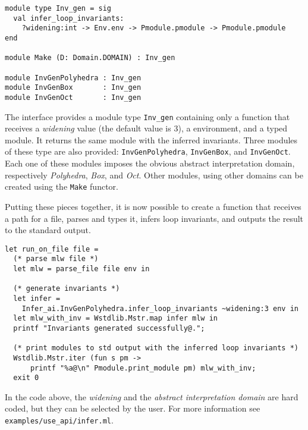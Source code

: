 \begin{verbatim}
module type Inv_gen = sig
  val infer_loop_invariants:
    ?widening:int -> Env.env -> Pmodule.pmodule -> Pmodule.pmodule
end

module Make (D: Domain.DOMAIN) : Inv_gen

module InvGenPolyhedra : Inv_gen
module InvGenBox       : Inv_gen
module InvGenOct       : Inv_gen
\end{verbatim}

The interface provides a module type \verb|Inv_gen| containing only a
function that receives a \emph{widening} value (the default value is
3), a \why environment, and a typed \why module. It returns the same
module with the inferred invariants. Three modules of these type are
also provided: \verb|InvGenPolyhedra|, \verb|InvGenBox|, and
\verb|InvGenOct|. Each one of these modules imposes the obvious
abstract interpretation domain, respectively \emph{Polyhedra},
\emph{Box}, and \emph{Oct}. Other modules, using other domains can be
created using the \verb|Make| functor.

Putting these pieces together, it is now possible to create a function
that receives a path for a \whyml file, parses and types it, infers
loop invariants, and outputs the result to the standard output.

\begin{verbatim}
let run_on_file file =
  (* parse mlw file *)
  let mlw = parse_file file env in

  (* generate invariants *)
  let infer =
    Infer_ai.InvGenPolyhedra.infer_loop_invariants ~widening:3 env in
  let mlw_with_inv = Wstdlib.Mstr.map infer mlw in
  printf "Invariants generated successfully@.";

  (* print modules to std output with the inferred loop invariants *)
  Wstdlib.Mstr.iter (fun s pm ->
      printf "%a@\n" Pmodule.print_module pm) mlw_with_inv;
  exit 0
\end{verbatim}

In the code above, the \emph{widening} and the \emph{abstract
  interpretation domain} are hard coded, but they can be selected by
the user. For more information see \verb|examples/use_api/infer.ml|.

